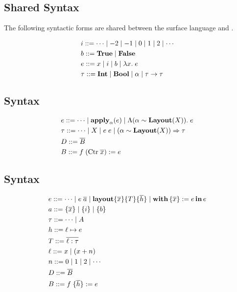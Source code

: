 \subsection{Shared Syntax}

The following syntactic forms are shared between the \Pika{} surface language and \PikaCore.

\begin{align*}
  &i ::= \cdots \mid -2 \mid -1 \mid 0 \mid 1 \mid 2 \mid \cdots
  \\
  &b ::= \textbf{True}{} \mid \textbf{False}
  \\
  &e ::= x \mid i \mid b \mid \lambda x.\; e
  \\
  &\tau ::= \textbf{Int} \mid \textbf{Bool} \mid \alpha \mid \tau \rightarrow \tau
\end{align*}

\subsection{\Pika{} Syntax}
\begin{align*}
  &e ::= \cdots \mid \textbf{apply}_{\alpha}(e) \mid \Lambda (\alpha \sim \textbf{Layout}(X)).\; e
  \\
  &\tau ::= \cdots \mid X \mid e\; e \mid (\alpha \sim \textbf{Layout}(X)) \Rightarrow \tau
  \\
  &D ::= \overline{B}
  \\
  &B ::= f\; (\textrm{Ctr}\; \overline{x}) := e
\end{align*}

\subsection{\PikaCore{} Syntax}
\begin{align*}
  &e ::= \cdots \mid e\; \overline{a} \mid \textbf{layout}\{ \overline{x} \}\{ T \}\{ \overline{h} \} \mid \textbf{with}\,\{ \overline{x} \} := e\,\textbf{in}\, e
  \\
  &a ::= \{ \overline{x} \} \mid \{ i \} \mid \{ b \}
  \\
  &\tau ::= \cdots \mid A
  \\
  &h ::= \ell \mapsto e
  \\
  &T ::= \overline{\ell : \tau}
  \\
  &\ell ::= x \mid (x + n)
  \\
  &n ::= 0 \mid 1 \mid 2 \mid \cdots
  \\
  &D ::= \overline{B}
  \\
  &B ::= f\; \{ \overline{h} \} := e
\end{align*}

